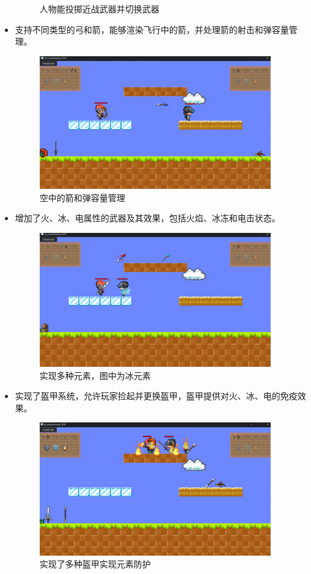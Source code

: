 \documentclass[UTF8]{ctexart}
\begin{document}
\begin{itemize}
\begin{figure}[H]
        \caption{人物能投掷近战武器并切换武器}
        \label{fig:screenshot_3}
    \end{figure}
    \item 支持不同类型的弓和箭，能够渲染飞行中的箭，并处理箭的射击和弹容量管理。
    \begin{figure}[H]
        \centering
        \includegraphics[width=10cm]{image/screenshot_4.png}
        \caption{空中的箭和弹容量管理}
        \label{fig:screenshot_4}
    \end{figure}
    \item 增加了火、冰、电属性的武器及其效果，包括火焰、冰冻和电击状态。
    \begin{figure}[H]
        \centering
        \includegraphics[width=10cm]{image/screenshot_5.png}
        \caption{实现多种元素，图中为冰元素}
        \label{fig:screenshot_5}
    \end{figure}
    \item 实现了盔甲系统，允许玩家捡起并更换盔甲，盔甲提供对火、冰、电的免疫效果。
    \begin{figure}[H]
        \centering
        \includegraphics[width=10cm]{image/screenshot_6.png}
        \caption{实现了多种盔甲实现元素防护}
        \label{fig:screenshot_6}
    \end{figure}
\end{itemize}
\end{document}
